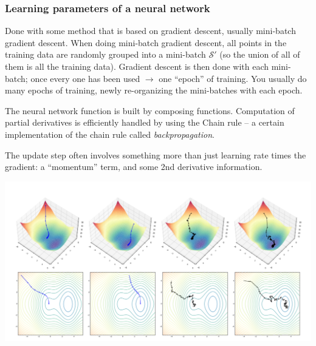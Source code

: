 \documentclass[smaller]{beamer}
\theoremstyle{example}
\begin{document}
\begin{frame}
    \frametitle{Learning parameters of a neural network}
    Done with some method that is based on gradient descent, usually mini-batch gradient descent. When doing mini-batch gradient descent, all points in the training data are randomly grouped into a mini-batch $\mathcal S'$ (so the union of all of them is all the training data). Gradient descent is then done with each mini-batch; once every one has been used $\to$ one ``epoch'' of training. You usually do many epochs of training, newly re-organizing the mini-batches with each epoch.   

    \pause 
    The neural network function is built by composing functions. Computation of partial derivatives is efficiently handled by using the Chain rule {--} a certain implementation of the chain rule called \textit{backpropagation}.

    \pause
    The update step often involves something more than just learning rate times the gradient: a ``momentum'' term, and some 2nd derivative information. 
    
    \vfill

    \centering
    \includegraphics[height=0.35\textheight]{../../Images/sgd-berner.png}
\end{frame}
\end{document}
